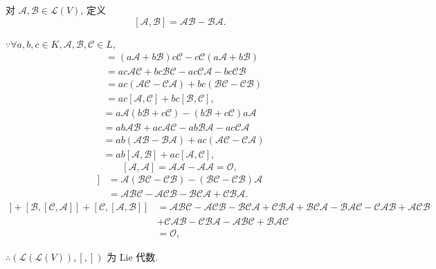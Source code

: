 \documentclass[color=black,device=normal,lang=cn,mode=geye]{elegantnote}
\begin{document}
\begin{example}
    对 $\mathcal{A},\mathcal{B}\in\mathcal{L}(V)$, 定义
    \[[\mathcal{A},\mathcal{B}]=\mathcal{A}\mathcal{B}-\mathcal{B}\mathcal{A}.\]

    $\because\forall a,b,c\in K,\mathcal{A},\mathcal{B},\mathcal{C}\in L$,
    \begin{align*}
        [a\mathcal{A}+b\mathcal{B},c\mathcal{C}] & =(a\mathcal{A}+b\mathcal{B})c\mathcal{C}-c\mathcal{C}(a\mathcal{A}+b\mathcal{B}) \\
        & =ac\mathcal{A}\mathcal{C}+bc\mathcal{B}\mathcal{C}-ac\mathcal{C}\mathcal{A}-bc\mathcal{C}\mathcal{B} \\
        & =ac(\mathcal{A}\mathcal{C}-\mathcal{C}\mathcal{A})+bc(\mathcal{B}\mathcal{C}-\mathcal{C}\mathcal{B}) \\
        & =ac[\mathcal{A},\mathcal{C}]+bc[\mathcal{B},\mathcal{C}],
    \end{align*}
    \begin{align*}
        [a\mathcal{A},b\mathcal{B}+c\mathcal{C}] & =a\mathcal{A}(b\mathcal{B}+c\mathcal{C})-(b\mathcal{B}+c\mathcal{C})a\mathcal{A} \\
        & =ab\mathcal{A}\mathcal{B}+ac\mathcal{A}\mathcal{C}-ab\mathcal{B}\mathcal{A}-ac\mathcal{C}\mathcal{A} \\
        & =ab(\mathcal{A}\mathcal{B}-\mathcal{B}\mathcal{A})+ac(\mathcal{A}\mathcal{C}-\mathcal{C}\mathcal{A}) \\
        & =ab[\mathcal{A},\mathcal{B}]+ac[\mathcal{A},\mathcal{C}],
    \end{align*}
    \[[\mathcal{A},\mathcal{A}]=\mathcal{A}\mathcal{A}-\mathcal{A}\mathcal{A}=\mathcal{O},\]
    \begin{align*}
        [\mathcal{A},[\mathcal{B},\mathcal{C}]] & =\mathcal{A}(\mathcal{B}\mathcal{C}-\mathcal{C}\mathcal{B})-(\mathcal{B}\mathcal{C}-\mathcal{C}\mathcal{B})\mathcal{A} \\
        & =\mathcal{A}\mathcal{B}\mathcal{C}-\mathcal{A}\mathcal{C}\mathcal{B}-\mathcal{B}\mathcal{C}\mathcal{A}+\mathcal{C}\mathcal{B}\mathcal{A}.
    \end{align*}
    \begin{align*}
        [\mathcal{A},[\mathcal{B},\mathcal{C}]]+[\mathcal{B},[\mathcal{C},\mathcal{A}]]+[\mathcal{C},[\mathcal{A},\mathcal{B}]] & =\mathcal{A}\mathcal{B}\mathcal{C}-\mathcal{A}\mathcal{C}\mathcal{B}-\mathcal{B}\mathcal{C}\mathcal{A}+\mathcal{C}\mathcal{B}\mathcal{A}+\mathcal{B}\mathcal{C}\mathcal{A}-\mathcal{B}\mathcal{A}\mathcal{C}-\mathcal{C}\mathcal{A}\mathcal{B}+\mathcal{A}\mathcal{C}\mathcal{B} \\
        & +\mathcal{C}\mathcal{A}\mathcal{B}-\mathcal{C}\mathcal{B}\mathcal{A}-\mathcal{A}\mathcal{B}\mathcal{C}+\mathcal{B}\mathcal{A}\mathcal{C} \\
        & =\mathcal{O},
    \end{align*}

    $\therefore(\mathcal{L}(\mathcal{L}(V)),[,])$ 为 Lie 代数.
\end{example}
\end{document}
